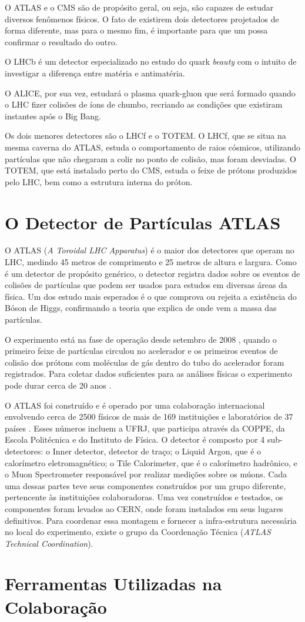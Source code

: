 O ATLAS e o CMS são de propósito geral, ou seja, são capazes de estudar diversos
fenômenos físicos. O fato de existirem dois detectores projetados de forma
diferente, mas para o mesmo fim, é importante para que um possa confirmar o
resultado do outro.

O LHCb é um detector especializado no estudo do quark \textit{beauty} com o
intuito de investigar a diferença entre matéria e antimatéria.

O ALICE, por sua vez, estudará o plasma quark-gluon que será formado quando o
LHC fizer colisões de íons de chumbo, recriando as condições que existiram
instantes após o Big Bang.

Os dois menores detectores são o LHCf e o TOTEM. O LHCf, que se situa na mesma
caverna do ATLAS, estuda o comportamento de raios cósmicos, utilizando
partículas que não chegaram a colir no ponto de colisão, mas foram desviadas.
O TOTEM, que está instalado perto do CMS, estuda o feixe de prótons produzidos
pelo LHC, bem como a estrutura interna do próton.

\section{O Detector de Partículas ATLAS}
\label{sec:ATLAS}

O ATLAS (\textit{A Toroidal LHC Apparatus}) é o maior dos detectores que operam
no LHC, medindo 45 metros de comprimento e 25 metros de altura e largura. Como é
um detector de propósito genérico, o detector registra dados sobre os eventos de
colisões de partículas que podem ser usados para estudos em diversas áreas da
física. Um dos estudo mais esperados é o que comprova ou rejeita a existência do Bóson de
Higgs, confirmando a teoria que explica de onde vem a massa das partículas.

O experimento está na fase de operação desde setembro de 2008 \cite{webLHCFirstBeam},
quando o primeiro feixe de partículas circulou no acelerador e os primeiros
eventos de colisão dos prótons com moléculas de gás dentro do tubo do acelerador
foram registrados. Para coletar dados suficientes para as análises físicas o
experimento pode durar cerca de 20 anos \cite{ATLAS_TDR}.

O ATLAS foi construído e é operado por uma colaboração internacional envolvendo
cerca de 2500 físicos de mais de 169 instituições e laboratórios de 37 países
\cite{webATLAS}. Esses números incluem a UFRJ, que participa através da COPPE,
da Escola Politécnica e do Instituto de Física. O detector é composto por 4
sub-detectores: o Inner detector, detector de traço; o Liquid Argon, que é o
calorímetro eletromagnético; o Tile Calorimeter, que é o calorímetro hadrônico,
e o Muon Spectrometer responsável por realizar medições sobre os múons. Cada uma
dessas partes teve seus componentes construídos por um grupo diferente,
pertencente às instituições colaboradoras.  Uma vez construídos e testados, os
componentes foram levados ao CERN, onde foram instalados em seus lugares
definitivos. Para coordenar essa montagem e fornecer a infra-estrutura
necessária no local do experimento, existe o grupo da Coordenação Técnica
({\it ATLAS Technical Coordination}).

\section{Ferramentas Utilizadas na Colaboração}
\label{sec:ferramentas}

